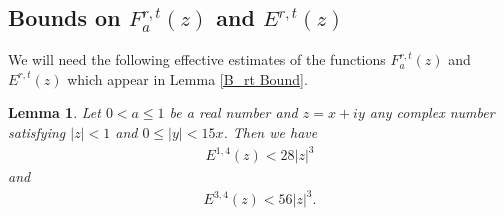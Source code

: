 \documentclass[11pt,reqno]{amsart}
\theoremstyle{definition}
\theoremstyle{plain}
\newtheorem{lemma}[theorem]{Lemma}
\theoremstyle{named}
\numberwithin{equation}{section}
\theoremstyle{example}
\begin{document}
\subsection{Bounds on $F_a^{r,t}(z)$ and $E^{r,t}(z)$}

We will need the following effective estimates of the functions $F_a^{r,t}(z)$ and $E^{r,t}(z)$ which appear in Lemma \ref{B_rt Bound}.

\begin{lemma} \label{E-Bounds}
Let $0 < a \leq 1$ be a real number and $z = x + iy$ any complex number satisfying $|z| < 1$ and $0 \leq |y| < 15x$. Then we have
\begin{align*}
    E^{1,4}(z) < 28 |z|^3
\end{align*}
and
\begin{align*}
	E^{3,4}(z) < 56 |z|^3.
\end{align*}
\end{lemma}
\end{document}
